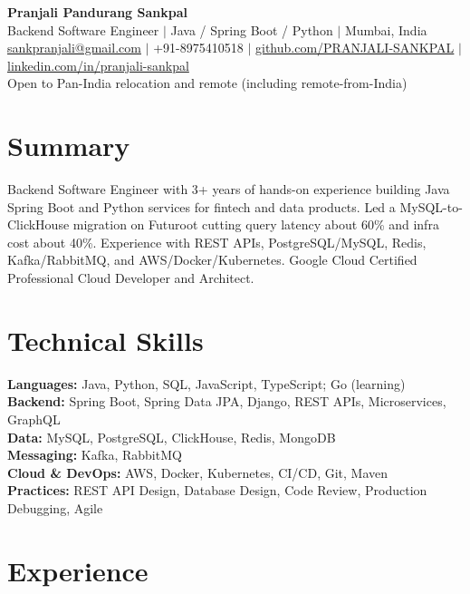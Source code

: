 \documentclass[9pt,letterpaper]{extarticle}
\begin{document}
\begin{center}
  {\fontsize{16}{18}\selectfont\bfseries Pranjali Pandurang Sankpal}\\[3pt]
  {\fontsize{10}{12}\selectfont Backend Software Engineer $|$ Java / Spring Boot / Python $|$ Mumbai, India}\\[2pt]
  {\fontsize{9}{11}\selectfont
  \href{mailto:sankpranjali@gmail.com}{sankpranjali@gmail.com}
  $|$ +91-8975410518
  $|$ \href{https://github.com/PRANJALI-SANKPAL}{github.com/PRANJALI-SANKPAL}
  $|$ \href{https://www.linkedin.com/in/pranjali-sankpal-aa1636232/}{linkedin.com/in/pranjali-sankpal}}\\[1pt]
  {\fontsize{8.5}{10}\selectfont Open to Pan-India relocation and remote (including remote-from-India)}
\end{center}

\section*{Summary}
Backend Software Engineer with 3+ years of hands-on experience building Java Spring Boot and Python services for fintech and data products. Led a MySQL-to-ClickHouse migration on Futuroot cutting query latency about 60\% and infra cost about 40\%. Experience with REST APIs, PostgreSQL/MySQL, Redis, Kafka/RabbitMQ, and AWS/Docker/Kubernetes. Google Cloud Certified Professional Cloud Developer and Architect.

\section*{Technical Skills}
\textbf{Languages:} Java, Python, SQL, JavaScript, TypeScript; Go (learning)\\
\textbf{Backend:} Spring Boot, Spring Data JPA, Django, REST APIs, Microservices, GraphQL\\
\textbf{Data:} MySQL, PostgreSQL, ClickHouse, Redis, MongoDB\\
\textbf{Messaging:} Kafka, RabbitMQ\\
\textbf{Cloud \& DevOps:} AWS, Docker, Kubernetes, CI/CD, Git, Maven\\
\textbf{Practices:} REST API Design, Database Design, Code Review, Production Debugging, Agile

\section*{Experience}
\end{document}
